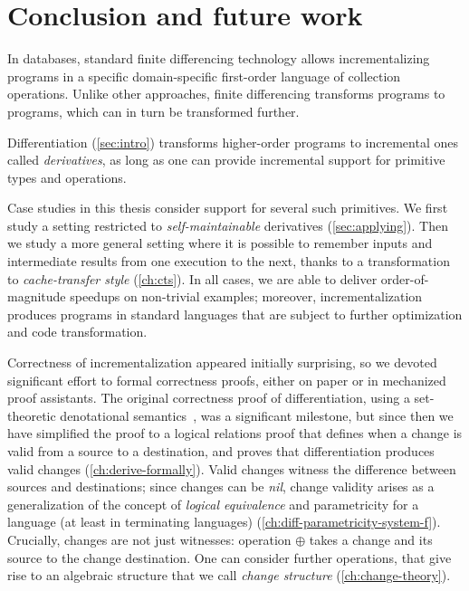 
\chapter{Conclusion and future work}
\label{ch:incl-conclusion}
In databases, standard finite differencing technology allows incrementalizing
programs in a specific domain-specific first-order language of collection
operations.
Unlike other approaches, finite differencing transforms programs to programs,
which can in turn be transformed further.

Differentiation (\cref{sec:intro}) transforms higher-order programs to incremental ones called \emph{derivatives}, as long as
one can provide incremental support for primitive types and operations.

Case studies in this thesis consider support for several such primitives. We first
study a setting restricted to \emph{self-maintainable} derivatives
(\cref{sec:applying}). Then we study a more general setting where it is possible
to remember inputs and intermediate results from one execution to the next,
thanks to a transformation to \emph{cache-transfer style} (\cref{ch:cts}). In all cases, we are
able to deliver order-of-magnitude speedups on non-trivial examples; moreover,
incrementalization produces programs in standard languages that are subject to
further optimization and code transformation.

Correctness of incrementalization appeared initially surprising, so we devoted
significant effort to formal correctness proofs, either on paper or in
mechanized proof assistants.
The original correctness proof of differentiation, using a set-theoretic
denotational semantics~\citep{CaiEtAl2014ILC}, was a significant milestone, but
since then we have
simplified the proof to a logical relations proof that defines when a change is
valid from a source to a destination, and proves that differentiation produces
valid changes (\cref{ch:derive-formally}). Valid changes witness the difference between
sources and destinations; since changes can be \emph{nil}, change validity
arises as a generalization of the concept of \emph{logical equivalence} and
parametricity for a language (at least in terminating languages)
(\cref{ch:diff-parametricity-system-f}). Crucially,
changes are not just witnesses: operation $\oplus$ takes a change and its
source to the change destination. One can consider further operations, that give
rise to an algebraic structure that we call \emph{change structure} (\cref{ch:change-theory}).

